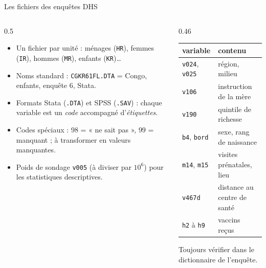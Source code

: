 \documentclass[aspectratio=169,11pt]{beamer}
\begin{document}
\begin{frame}{Les fichiers des enquêtes DHS}
  \begin{columns}[T]
    \begin{column}{0.5\textwidth}
      \small
      \begin{itemize}
        \item Un fichier par unité : ménages (\texttt{HR}), femmes (\texttt{IR}), hommes (\texttt{MR}), enfants (\texttt{KR})\dots
        \item Noms standard : \texttt{CGKR61FL.DTA} = Congo, enfants, enquête 6, Stata.
        \item Formats Stata (\texttt{.DTA}) et SPSS (\texttt{.SAV}) : chaque variable est un \emph{code} accompagné d'\emph{étiquettes}.
        \item Codes spéciaux : $98$ = « ne sait pas », $99$ = manquant ; à transformer en valeurs manquantes.
        \item Poids de sondage \texttt{v005} (à diviser par $10^6$) pour les statistiques descriptives.
      \end{itemize}
    \end{column}
    \begin{column}{0.46\textwidth}
      \small\centering
      \renewcommand{\arraystretch}{1.15}
      \begin{tabular}{ll}
        \toprule
        \textbf{variable} & \textbf{contenu} \\
        \midrule
        \texttt{v024}, \texttt{v025} & région, milieu \\
        \texttt{v106} & instruction de la mère \\
        \texttt{v190} & quintile de richesse \\
        \texttt{b4}, \texttt{bord} & sexe, rang de naissance \\
        \texttt{m14}, \texttt{m15} & visites prénatales, lieu \\
        \texttt{v467d} & distance au centre de santé \\
        \texttt{h2} à \texttt{h9} & vaccins reçus \\
        \bottomrule
      \end{tabular}
      \vskip1mm
      {\scriptsize\color{cnfGris}Toujours vérifier dans le dictionnaire de l'enquête.}
    \end{column}
  \end{columns}
\end{frame}
\end{document}
